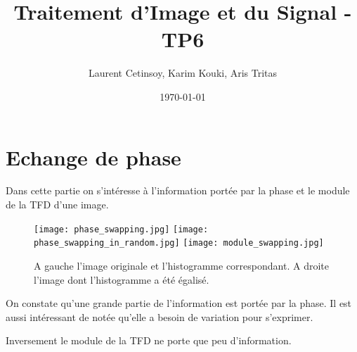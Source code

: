 \documentclass{article}
\title{Traitement d'Image et du Signal - TP6}
\author{Laurent Cetinsoy, Karim Kouki, Aris Tritas }
\date{\today}
\begin{document}
\maketitle

\section{Echange de phase}

Dans cette partie on s'intéresse à l'information portée par la phase et le module de la TFD d'une image. 


\begin{figure}[h]
	\texttt{[image: phase\_swapping.jpg]}
	\texttt{[image: phase\_swapping\_in\_random.jpg]}
	\newline
	\texttt{[image: module\_swapping.jpg]}

  \caption{A gauche l'image originale et l'histogramme correspondant. A droite l'image dont l'histogramme a été égalisé. }
\end{figure}


On constate qu'une grande partie de l'information est portée par la phase. Il est aussi intéressant de notée qu'elle a besoin de variation pour s'exprimer. 

Inversement le module de la TFD ne porte que peu d'information. 
\end{document}
